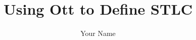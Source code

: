 \documentclass{article}
\title{Using Ott to Define STLC}
\author{Your Name}
\begin{document}
  \maketitle
  \begin{abstract}
    
  \end{abstract}
  
  
  \appendix
  
\end{document}
